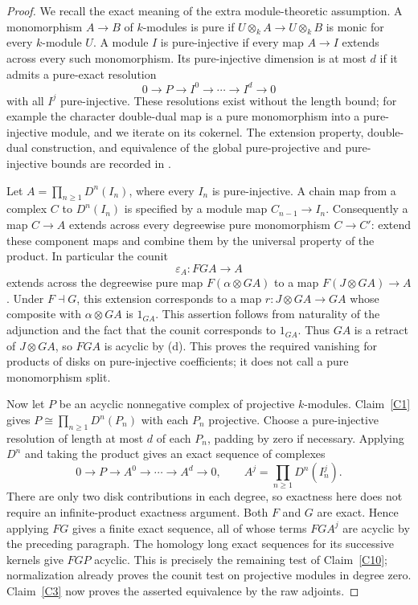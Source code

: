 \begin{proof}
We recall the exact meaning of the extra module-theoretic assumption. A monomorphism $A\to B$ of $k$-modules is pure if $U\otimes_k A\to U\otimes_k B$ is monic for every $k$-module $U$. A module $I$ is pure-injective if every map $A\to I$ extends across every such monomorphism. Its pure-injective dimension is at most $d$ if it admits a pure-exact resolution
\[
 0\longrightarrow P\longrightarrow I^0\longrightarrow\cdots
 \longrightarrow I^d\longrightarrow0
\]
with all $I^j$ pure-injective. These resolutions exist without the length bound; for example the character double-dual map is a pure monomorphism into a pure-injective module, and we iterate on its cokernel. The extension property, double-dual construction, and equivalence of the global pure-projective and pure-injective bounds are recorded in \citet[Sections 2.3--2.5]{BensonGnacadja1999}.

Let $A=\prod_{n\geq1}D^n(I_n)$, where every $I_n$ is pure-injective. A chain map from a complex $C$ to $D^n(I_n)$ is specified by a module map $C_{n-1}\to I_n$. Consequently a map $C\to A$ extends across every degreewise pure monomorphism $C\to C'$: extend these component maps and combine them by the universal property of the product. In particular the counit
\[
 \varepsilon_A:FGA\longrightarrow A
\]
extends across the degreewise pure map $F(\alpha\otimes GA)$ to a map $F(J\otimes GA)\to A$. Under $F\dashv G$, this extension corresponds to a map $r:J\otimes GA\to GA$ whose composite with $\alpha\otimes GA$ is $1_{GA}$. This assertion follows from naturality of the adjunction and the fact that the counit corresponds to $1_{GA}$. Thus $GA$ is a retract of $J\otimes GA$, so $FGA$ is acyclic by (d). This proves the required vanishing for products of disks on pure-injective coefficients; it does not call a pure monomorphism split.

Now let $P$ be an acyclic nonnegative complex of projective $k$-modules. Claim~\ref{C1} gives $P\cong\prod_{n\geq1}D^n(P_n)$ with each $P_n$ projective. Choose a pure-injective resolution of length at most $d$ of each $P_n$, padding by zero if necessary. Applying $D^n$ and taking the product gives an exact sequence of complexes
\[
 0\longrightarrow P\longrightarrow A^0\longrightarrow\cdots
 \longrightarrow A^d\longrightarrow0,
 \qquad A^j=\prod_{n\geq1}D^n(I_n^j).
\]
There are only two disk contributions in each degree, so exactness here does not require an infinite-product exactness argument. Both $F$ and $G$ are exact. Hence applying $FG$ gives a finite exact sequence, all of whose terms $FGA^j$ are acyclic by the preceding paragraph. The homology long exact sequences for its successive kernels give $FGP$ acyclic. This is precisely the remaining test of Claim~\ref{C10}; normalization already proves the counit test on projective modules in degree zero. Claim~\ref{C3} now proves the asserted equivalence by the raw adjoints.


\end{proof}
